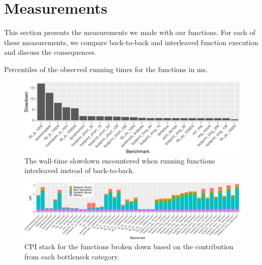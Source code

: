 \section{Measurements}
\label{sec:measurements}

This section presents the measurements we made with our functions. %
For each of these measurements, we compare back-to-back and interleaved function execution and discuss the consequences.
\begin{table}
  \caption{\label{tab:timings} Percentiles of the observed running times for the functions in ms.}
  \centering
  
\end{table}


\begin{figure}
  \centering
  \includegraphics[width=\textwidth]{figures/thrasher_speedups.pdf}
  \caption{\label{fig:slowdown} The wall-time slowdown encountered when running functions interleaved instead of back-to-back.}
\end{figure}

\begin{figure}
  \centering
  \includegraphics[width=\textwidth]{figures/topdown_level1.pdf}
  \caption{\label{fig:topdown_level1} CPI stack for the functions broken down based on the contribution from each bottleneck category.}
\end{figure}



